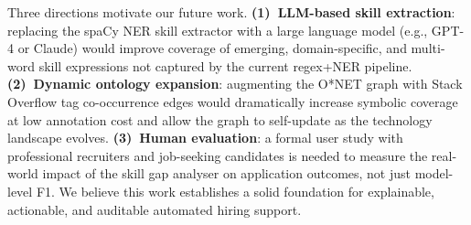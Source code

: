 \documentclass[conference]{IEEEtran}
\begin{document}
Three directions motivate our future work. \textbf{(1)~LLM-based skill
extraction}: replacing the spaCy NER skill extractor with a large language
model (e.g., GPT-4 or Claude) would improve coverage of emerging,
domain-specific, and multi-word skill expressions not captured by the
current regex+NER pipeline. \textbf{(2)~Dynamic ontology expansion}: augmenting
the O*NET graph with Stack Overflow tag co-occurrence edges would dramatically
increase symbolic coverage at low annotation cost and allow the graph to
self-update as the technology landscape evolves. \textbf{(3)~Human
evaluation}: a formal user study with professional recruiters and job-seeking
candidates is needed to measure the real-world impact of the skill gap
analyser on application outcomes, not just model-level F1. We believe this
work establishes a solid foundation for explainable, actionable, and
auditable automated hiring support.
\end{document}

